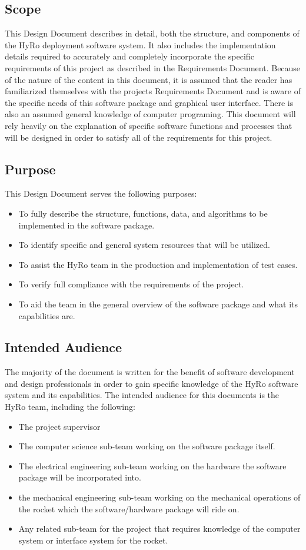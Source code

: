 \documentclass[10pt,draftclsnofoot,onecolumn,compsoc]{IEEEtran}
\begin{document}
\subsection{Scope}
This Design Document describes in detail, both the structure, and components of the HyRo deployment software system. It also includes the implementation details required to accurately and completely incorporate the specific requirements of this project as described in the Requirements Document. Because of the nature of the content in this document, it is assumed that the reader has familiarized themselves with the projects Requirements Document and is aware of the specific needs of this software package and graphical user interface. There is also an assumed general knowledge of computer programing. This document will rely heavily on the explanation of specific software functions and processes that will be designed in order to satisfy all of the requirements for this project. 
\subsection{Purpose}
This Design Document serves the following purposes:
\begin{itemize}
	\item To fully describe the structure, functions, data, and algorithms to be implemented in the software package.
	\item To identify specific and general system resources that will be utilized.
	\item To assist the HyRo team in the production and implementation of test cases.
	\item To verify full compliance with the requirements of the project.
	\item To aid the team in the general overview of the software package and what its capabilities are.
\end{itemize}
\subsection{Intended Audience}
The majority of the document is written for the benefit of software development and design professionals in order to gain specific knowledge of the HyRo software system and its capabilities. The intended audience for this documents is the HyRo team, including the following:
\begin{itemize}
	\item The project supervisor 
	\item The computer science sub-team working on the software package itself.
	\item The electrical engineering sub-team working on the hardware the software package will be incorporated into.
	\item the mechanical engineering sub-team working on the mechanical operations of the rocket which the software/hardware package will ride on.
	\item Any related sub-team for the project that requires knowledge of the computer system or interface system for the rocket.
\end{itemize}
\end{document}
